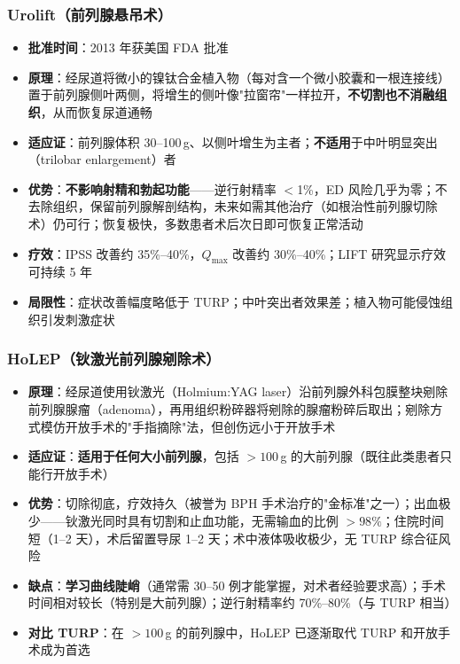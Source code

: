 \documentclass[12pt,a4paper,twoside]{ctexbook}
\begin{document}
\subsubsection{Urolift（前列腺悬吊术）}
\begin{itemize}[leftmargin=2cm]
	\item \textbf{批准时间}：2013 年获美国 FDA 批准
	\item \textbf{原理}：经尿道将微小的镍钛合金植入物（每对含一个微小胶囊和一根连接线）置于前列腺侧叶两侧，将增生的侧叶像"拉窗帘"一样拉开，\textbf{不切割也不消融组织}，从而恢复尿道通畅
	\item \textbf{适应证}：前列腺体积 30--100\,g、以侧叶增生为主者；\textbf{不适用}于中叶明显突出（trilobar enlargement）者
	\item \textbf{优势}：\textbf{不影响射精和勃起功能}——逆行射精率 $<$1\%，ED 风险几乎为零；不去除组织，保留前列腺解剖结构，未来如需其他治疗（如根治性前列腺切除术）仍可行；恢复极快，多数患者术后次日即可恢复正常活动
	\item \textbf{疗效}：IPSS 改善约 35\%--40\%，$Q_{\max}$ 改善约 30\%--40\%；LIFT 研究显示疗效可持续 5 年
	\item \textbf{局限性}：症状改善幅度略低于 TURP；中叶突出者效果差；植入物可能侵蚀组织引发刺激症状
\end{itemize}

\subsubsection{HoLEP（钬激光前列腺剜除术）}
\begin{itemize}[leftmargin=2cm]
	\item \textbf{原理}：经尿道使用钬激光（Holmium:YAG laser）沿前列腺外科包膜整块剜除前列腺腺瘤（adenoma），再用组织粉碎器将剜除的腺瘤粉碎后取出；剜除方式模仿开放手术的"手指摘除"法，但创伤远小于开放手术
	\item \textbf{适应证}：\textbf{适用于任何大小前列腺}，包括 $>100$\,g 的大前列腺（既往此类患者只能行开放手术）
	\item \textbf{优势}：切除彻底，疗效持久（被誉为 BPH 手术治疗的"金标准"之一）；出血极少——钬激光同时具有切割和止血功能，无需输血的比例 $>98\%$；住院时间短（1--2 天），术后留置导尿 1--2 天；术中液体吸收极少，无 TURP 综合征风险
	\item \textbf{缺点}：\textbf{学习曲线陡峭}（通常需 30--50 例才能掌握，对术者经验要求高）；手术时间相对较长（特别是大前列腺）；逆行射精率约 70\%--80\%（与 TURP 相当）
	\item \textbf{对比 TURP}：在 $>100$\,g 的前列腺中，HoLEP 已逐渐取代 TURP 和开放手术成为首选
\end{itemize}
\end{document}
